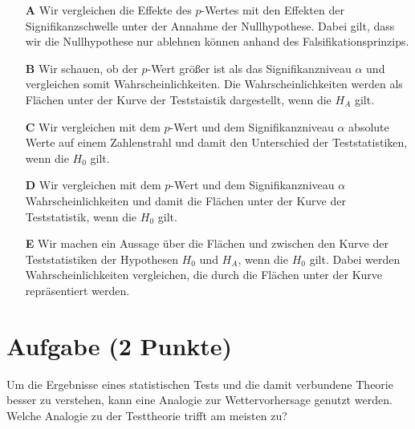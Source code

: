 \documentclass[a4paper, 9pt]{scrartcl}\usepackage[]{graphicx}\usepackage[]{xcolor}
\begin{document}
\begin{enumerate}
\item [\textbf{A} \msquare] Wir vergleichen die Effekte des $p$-Wertes mit den Effekten der Signifikanzschwelle unter der Annahme der Nullhypothese. Dabei gilt, dass wir die Nullhypothese nur ablehnen können anhand des Falsifikationsprinzips.
\item [\textbf{B} \msquare] Wir schauen, ob der $p$-Wert größer ist als das Signifikanzniveau $\alpha$ und vergleichen somit Wahrscheinlichkeiten. Die Wahrscheinlichkeiten werden als Flächen unter der Kurve der Teststaistik dargestellt, wenn die $H_A$ gilt.
\item [\textbf{C} \msquare] Wir vergleichen mit dem $p$-Wert und dem Signifikanzniveau $\alpha$ absolute Werte auf einem Zahlenstrahl und damit den Unterschied der Teststatistiken, wenn die $H_0$ gilt.
\item [\textbf{D} \msquare] Wir vergleichen mit dem $p$-Wert und dem Signifikanzniveau $\alpha$ Wahrscheinlichkeiten und damit die Flächen unter der Kurve der Teststatistik, wenn die $H_0$ gilt.
\item [\textbf{E} \msquare] Wir machen ein Aussage über die Flächen und zwischen den Kurve der Teststatistiken der Hypothesen $H_0$ und $H_A$, wenn die $H_0$ gilt. Dabei werden Wahrscheinlichkeiten vergleichen, die durch die Flächen unter der Kurve repräsentiert werden.
\end{enumerate}

\section{Aufgabe \hfill (2 Punkte)}



Um die Ergebnisse eines statistischen Tests und die damit verbundene Theorie besser zu verstehen, kann eine Analogie zur Wettervorhersage genutzt werden. Welche Analogie zu der Testtheorie trifft am meisten zu?
\end{document}
